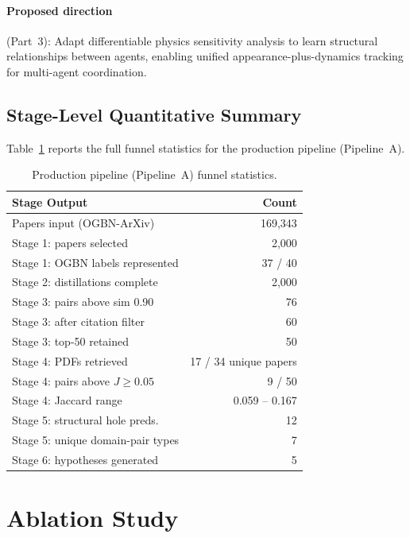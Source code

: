 \documentclass[11pt]{article}
\begin{document}
\paragraph{Proposed direction} (Part~3): Adapt differentiable physics
sensitivity analysis to learn structural relationships between agents,
enabling unified appearance-plus-dynamics tracking for multi-agent coordination.

\subsection{Stage-Level Quantitative Summary}

Table~\ref{tab:funnel} reports the full funnel statistics for the
production pipeline (Pipeline~A).

\begin{table}[h]
\small
\centering
\begin{tabular}{lr}
\toprule
\textbf{Stage Output} & \textbf{Count} \\
\midrule
Papers input (OGBN-ArXiv)         & 169,343 \\
Stage 1: papers selected          & 2,000 \\
Stage 1: OGBN labels represented  & 37 / 40 \\
Stage 2: distillations complete   & 2,000 \\
Stage 3: pairs above sim 0.90     & 76 \\
Stage 3: after citation filter    & 60 \\
Stage 3: top-50 retained          & 50 \\
Stage 4: PDFs retrieved           & 17 / 34 unique papers \\
Stage 4: pairs above $J \geq 0.05$& 9 / 50 \\
Stage 4: Jaccard range            & 0.059 -- 0.167 \\
Stage 5: structural hole preds.   & 12 \\
Stage 5: unique domain-pair types & 7 \\
Stage 6: hypotheses generated     & 5 \\
\bottomrule
\end{tabular}
\caption{Production pipeline (Pipeline~A) funnel statistics.}
\label{tab:funnel}
\end{table}

\section{Ablation Study}
\label{sec:ablation}
\end{document}
